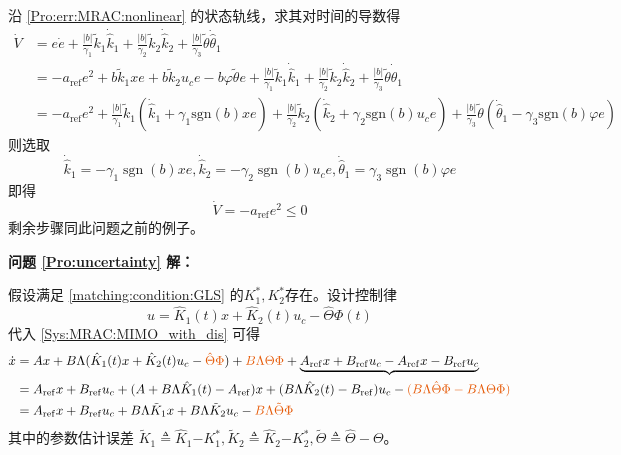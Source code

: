 沿 \eqref{Pro:err:MRAC:nonlinear} 的状态轨线，求其对时间的导数得
\begin{equation*}
    \begin{aligned}\dot{V}&= e\dot{e}+\frac{|b|}{\gamma_{1}}\tilde{k}_{1}\dot{\hat{k}}_{1}+\frac{|b|}{\gamma_{2}}\tilde{k}_{2}\dot{\hat{k}}_{2}+\frac{|b|}{\gamma_{3}}\tilde{\theta}\dot{\hat{\theta}}_{1}\\
    &=-a_{\mathrm{ref}}e^{2}+b\tilde{k}_{1}xe+b\tilde{k}_{2}u_{c}e-b\varphi\tilde{\theta}e+\frac{|b|}{\gamma_{1}}\tilde{k}_{1}\dot{\hat{k}}_{1}+\frac{|b|}{\gamma_{2}}\tilde{k}_{2}\dot{\hat{k}}_{2}+\frac{|b|}{\gamma_{3}}\tilde{\theta}\dot{\hat{\theta}}_{1}\\
    &=-a_{\mathrm{ref}}e^{2}+\frac{|b|}{\gamma_{1}}\tilde{k}_{1}\left(\dot{\hat{k}}_{1}+\gamma_{1}\mathrm{sgn}(b)xe\right)+\frac{|b|}{\gamma_{2}}\tilde{k}_{2}\left(\dot{\hat{k}}_{2}+\gamma_{2}\mathrm{sgn}(b)u_{c}e\right)+\frac{|b|}{\gamma_{3}}\tilde{\theta}\left(\dot{\hat{\theta}}_{1}-\gamma_{3}\mathrm{sgn}(b)\varphi e\right)\end{aligned}
\end{equation*}
则选取
\begin{equation*}
  \dot{\hat{k}}_1 = -  \gamma_1 \ensuremath{\operatorname{sgn}} (b) x  e,
  \dot{\hat{k}}_2 = -  \gamma_2 \ensuremath{\operatorname{sgn}} (b)  u_c e,
  \dot{\hat{\theta}}_1 = \gamma_3 \ensuremath{\operatorname{sgn}} (b)   \varphi e
\end{equation*}
即得
\begin{equation*}
  \dot{V} = - a_{\ensuremath{\operatorname{ref}}} e^2 \leq 0
\end{equation*}
剩余步骤同此问题之前的例子。

\noindent\textcolor{winered}{\textbf{问题 \ref{Pro:uncertainty} 解：}}

假设满足 \eqref{matching:condition:GLS} 的$K^{\ast}_1, K^{\ast}_2$存在。设计控制律\[ u = \hat{K}_1 (t) x + \hat{K}_2 (t) u_c - \hat{\Theta}\Phi (t)  \]
代入 \eqref{Sys:MRAC:MIMO_with_dis} 可得
\begin{align}
    \dot{x}&=A  x + B \Lambda (\hat{K}_1 (t) x + \hat{K}_2 (t) u_c-\textcolor{second}{\hat{\Theta}\Phi})+\textcolor{second}{B\Lambda\Theta\Phi}+
    \underbrace{A_{\ensuremath{\operatorname{ref}}} x +
    B_{\ensuremath{\operatorname{ref}}} u_c-A_{\ensuremath{\operatorname{ref}}} x -
    B_{\ensuremath{\operatorname{ref}}} u_c}\nonumber\\
    &=A_{\ensuremath{\operatorname{ref}}} x +
    B_{\ensuremath{\operatorname{ref}}} u_c+(A + B \Lambda \hat{K}_1 (t)-A_{\ensuremath{\operatorname{ref}}}) x+(B\Lambda\hat{K}_2 (t)-B_{\ensuremath{\operatorname{ref}}}) u_c-\textcolor{second}{(B\Lambda\hat{\Theta}\Phi-B\Lambda\Theta\Phi)}\nonumber\\
    &=A_{\ensuremath{\operatorname{ref}}}  x +
   B_{\ensuremath{\operatorname{ref}}} u_c + B \Lambda  \tilde{K}_1 x + B
   \Lambda  \tilde{K}_2 u_c -\textcolor{second}{B\Lambda\tilde{\Theta}\Phi}\label{mimo_with_dis_dotx}
\end{align}
其中的参数估计误差 $\tilde{K}_1 \triangleq \hat{K}_1 {- K_1^{\ast}} , \tilde{K}_2 \triangleq \hat{K}_2 {- K_2^{\ast}} ,\tilde{\Theta}\triangleq\hat{\Theta}-\Theta$。

